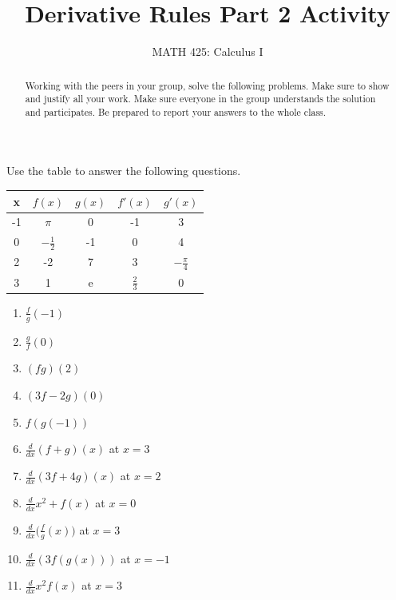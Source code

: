\documentclass{ximera}
\title{Derivative Rules Part 2 Activity}
\author{MATH 425: Calculus I}
\begin{document}
\begin{abstract}
    Working with the peers in your group, solve the following problems. Make sure to show and justify all your work. Make sure everyone in the group understands the solution and participates. Be prepared to report your answers to the whole class. 
\end{abstract}
\maketitle

\begin{exercise}
    Use the table to answer the following questions.\\  
    \begin{tabular}{c|c|c|c|c}
        x  & $f(x)$ & $g(x)$ & $f'(x)$ & $g'(x)$   \\ \hline
        -1  & $\pi$ & 0 & -1 & 3\\ \hline
        0 & $-\frac12$ & -1 & 0 & 4\\ \hline
        2 & -2 & 7 & 3 & $-\frac{\pi}{4}$ \\ \hline
        3 & 1 & e & $\frac23$ & 0\\%
    \end{tabular}
    \begin{enumerate}
        \item $\frac{f}{g}(-1)$
        \item $\frac{g}{f}(0)$
        \item $(fg)(2)$
        \item $(3f-2g)(0)$
        \item $f(g(-1))$
        \item $\frac{d}{dx} (f+g)(x)$ at $x=3$
        \item $\frac{d}{dx} (3f+4g)(x)$ at $x=2$
        \item $\frac{d}{dx} x^2+f(x)$ at $x=0$
        \item $\frac{d}{dx} \big(\frac{f}{g}(x)\big)$ at $x=3$
        \item $\frac{d}{dx} (3f(g(x)))$ at $x=-1$
        \item $\frac{d}{dx} x^2f(x)$ at $x=3$
    \end{enumerate}
\end{exercise}
\end{document}
